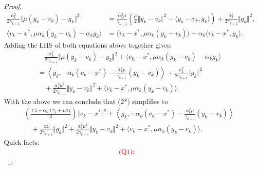 \documentclass[12pt]{article}
\begin{document}
\begin{proof}
{\begin{align*}
            \frac{\alpha^2_k}{2\gamma_{k + 1}} 
            \Vert \mu(y_k - v_k) - g_k\Vert^2
            & = 
            \frac{\alpha_k^2\mu}{\gamma_{k + 1}}
            \left(
                \frac{\mu}{2}\Vert y_k - v_k\Vert^2 
                - \langle y_k - v_k, g_k\rangle
            \right)
            + \frac{\alpha_k^2}{2\gamma_{k + 1}}\Vert g_k\Vert^2, 
            \\
            \langle v_k - x^*, \mu \alpha_k(y_k - v_k) - \alpha_k g_k\rangle
            &= 
            \langle v_k - x^*, \mu\alpha_k(y_k - v_k)\rangle 
            - \alpha_k \langle v_k - x^*, g_k\rangle. 
        \tag{2.1*}
        \end{align*}
        }
        Adding the LHS of both equations above together gives: 
        \begin{align*}
            & \quad 
            \frac{\alpha^2_k}{2\gamma_{k + 1}} 
            \Vert \mu(y_k - v_k) - g_k\Vert^2
            + 
            \langle v_k - x^*, \mu \alpha_k(y_k - v_k) - \alpha_k g_k\rangle
            \\
            &= 
            \left\langle g_k, 
                - \alpha_k(v_k - x^*) 
                - \frac{\alpha_k^2\mu}{\gamma_{k + 1}}(y_k - v_k)
            \right\rangle
            + \frac{\alpha_k^2}{2\gamma_{k + 1}}\Vert g_k\Vert^2
            \\
                &\quad 
                + \frac{\alpha_k^2 \mu^2}{2\gamma_{k + 1}}\Vert y_k - v_k\Vert^2
                + \langle v_k - x^*, \mu\alpha_k(y_k - v_k)\rangle. 
        \end{align*}
        With the above we can conclude that (2*) simplifies to 
        {\small
        \begin{align*} 
            & 
            \left(
            \frac{(1 - \alpha_k)\gamma_k + \mu \alpha_k}{2} 
            \right)\Vert v_k - x^*\Vert^2
            + 
            \left\langle g_k, 
                - \alpha_k(v_k - x^*) 
                - \frac{\alpha_k^2\mu}{\gamma_{k + 1}}(y_k - v_k)
            \right\rangle
            \\
            & \quad 
                + \frac{\alpha_k^2}{2\gamma_{k + 1}}\Vert g_k\Vert^2
                + \frac{\alpha_k^2 \mu^2}{2\gamma_{k + 1}}\Vert y_k - v_k\Vert^2
                + \langle v_k - x^*, \mu\alpha_k(y_k - v_k)\rangle. 
        \tag{2.2*}
        \end{align*}
        }
        Quick facts: 
        \textcolor{red}{
        \begin{align*}
            \text{(Q1)}: 

\end{align*}}
\end{proof}
\end{document}
